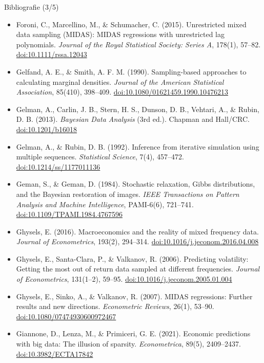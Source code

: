 \begin{frame}{Bibliografie (3/5)}
\itemsize{\tiny}
\begin{itemize}
    \item Foroni, C., Marcellino, M., \& Schumacher, C. (2015). Unrestricted mixed data sampling (MIDAS): MIDAS regressions with unrestricted lag polynomials. \textit{Journal of the Royal Statistical Society: Series A}, 178(1), 57--82. \href{https://doi.org/10.1111/rssa.12043}{doi:10.1111/rssa.12043}
    \item Gelfand, A. E., \& Smith, A. F. M. (1990). Sampling-based approaches to calculating marginal densities. \textit{Journal of the American Statistical Association}, 85(410), 398--409. \href{https://doi.org/10.1080/01621459.1990.10476213}{doi:10.1080/01621459.1990.10476213}
    \item Gelman, A., Carlin, J. B., Stern, H. S., Dunson, D. B., Vehtari, A., \& Rubin, D. B. (2013). \textit{Bayesian Data Analysis} (3rd ed.). Chapman and Hall/CRC. \href{https://doi.org/10.1201/b16018}{doi:10.1201/b16018}
    \item Gelman, A., \& Rubin, D. B. (1992). Inference from iterative simulation using multiple sequences. \textit{Statistical Science}, 7(4), 457--472. \href{https://doi.org/10.1214/ss/1177011136}{doi:10.1214/ss/1177011136}
    \item Geman, S., \& Geman, D. (1984). Stochastic relaxation, Gibbs distributions, and the Bayesian restoration of images. \textit{IEEE Transactions on Pattern Analysis and Machine Intelligence}, PAMI-6(6), 721--741. \href{https://doi.org/10.1109/TPAMI.1984.4767596}{doi:10.1109/TPAMI.1984.4767596}
    \item Ghysels, E. (2016). Macroeconomics and the reality of mixed frequency data. \textit{Journal of Econometrics}, 193(2), 294--314. \href{https://doi.org/10.1016/j.jeconom.2016.04.008}{doi:10.1016/j.jeconom.2016.04.008}
    \item Ghysels, E., Santa-Clara, P., \& Valkanov, R. (2006). Predicting volatility: Getting the most out of return data sampled at different frequencies. \textit{Journal of Econometrics}, 131(1--2), 59--95. \href{https://doi.org/10.1016/j.jeconom.2005.01.004}{doi:10.1016/j.jeconom.2005.01.004}
    \item Ghysels, E., Sinko, A., \& Valkanov, R. (2007). MIDAS regressions: Further results and new directions. \textit{Econometric Reviews}, 26(1), 53--90. \href{https://doi.org/10.1080/07474930600972467}{doi:10.1080/07474930600972467}
    \item Giannone, D., Lenza, M., \& Primiceri, G. E. (2021). Economic predictions with big data: The illusion of sparsity. \textit{Econometrica}, 89(5), 2409--2437. \href{https://doi.org/10.3982/ECTA17842}{doi:10.3982/ECTA17842}

\end{itemize}
\end{frame}
